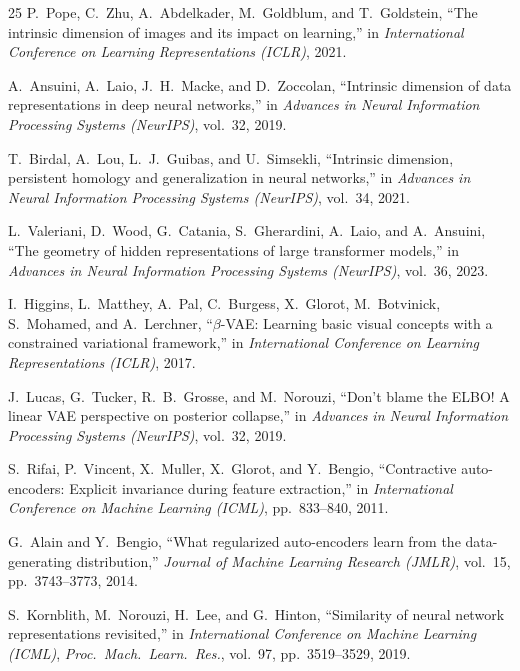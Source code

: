 \documentclass[lettersize,journal]{IEEEtran}
\begin{document}
\begin{thebibliography}{25}
P.~Pope, C.~Zhu, A.~Abdelkader, M.~Goldblum, and T.~Goldstein,
``The intrinsic dimension of images and its impact on learning,''
in \textit{International Conference on Learning Representations (ICLR)}, 2021.

A.~Ansuini, A.~Laio, J.~H.~Macke, and D.~Zoccolan,
``Intrinsic dimension of data representations in deep neural networks,''
in \textit{Advances in Neural Information Processing Systems (NeurIPS)},
vol.~32, 2019.

T.~Birdal, A.~Lou, L.~J.~Guibas, and U.~Simsekli,
``Intrinsic dimension, persistent homology and generalization in neural networks,''
in \textit{Advances in Neural Information Processing Systems (NeurIPS)},
vol.~34, 2021.

L.~Valeriani, D.~Wood, G.~Catania, S.~Gherardini, A.~Laio, and A.~Ansuini,
``The geometry of hidden representations of large transformer models,''
in \textit{Advances in Neural Information Processing Systems (NeurIPS)},
vol.~36, 2023.

I.~Higgins, L.~Matthey, A.~Pal, C.~Burgess, X.~Glorot, M.~Botvinick,
S.~Mohamed, and A.~Lerchner,
``$\beta$-VAE: Learning basic visual concepts with a constrained variational framework,''
in \textit{International Conference on Learning Representations (ICLR)}, 2017.

J.~Lucas, G.~Tucker, R.~B.~Grosse, and M.~Norouzi,
``Don't blame the ELBO! A linear VAE perspective on posterior collapse,''
in \textit{Advances in Neural Information Processing Systems (NeurIPS)}, vol.~32, 2019.

S.~Rifai, P.~Vincent, X.~Muller, X.~Glorot, and Y.~Bengio,
``Contractive auto-encoders: Explicit invariance during feature extraction,''
in \textit{International Conference on Machine Learning (ICML)},
pp.~833--840, 2011.

G.~Alain and Y.~Bengio,
``What regularized auto-encoders learn from the data-generating distribution,''
\textit{Journal of Machine Learning Research (JMLR)}, vol.~15, pp.~3743--3773, 2014.

S.~Kornblith, M.~Norouzi, H.~Lee, and G.~Hinton,
``Similarity of neural network representations revisited,''
in \textit{International Conference on Machine Learning (ICML)},
\textit{Proc.~Mach.~Learn.~Res.}, vol.~97, pp.~3519--3529, 2019.


\end{thebibliography}
\end{document}
